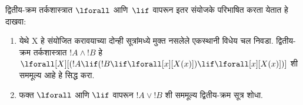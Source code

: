 \documentclass[../../../include/open-logic-section]{subfiles}
\begin{document}
\begin{prob}
  द्वितीय-क्रम
  तर्कशास्त्रात
  $\lforall$
  आणि~$\lif$
  वापरून इतर
  संयोजके
  परिभाषित
  करता येतात
  हे दाखवा:
  \begin{enumerate}
    \item येथे X हे संयोजित करावयाच्या दोन्ही सूत्रांमध्ये मुक्त नसलेले
    एकस्थानी विधेय चल निवडा. द्वितीय-क्रम तर्कशास्त्रात $!A \land !B$ हे
    $\lforall[X][(!A \lif (!B \lif \lforall[x][X(x)])\lif
    \lforall[x][X(x)])]$ शी सममूल्य आहे हे सिद्ध करा.
    \item फक्त $\lforall$ आणि $\lif$ वापरून
    $!A \lor !B$ शी सममूल्य द्वितीय-क्रम सूत्र शोधा.
  \end{enumerate}
\end{prob}
\end{document}
